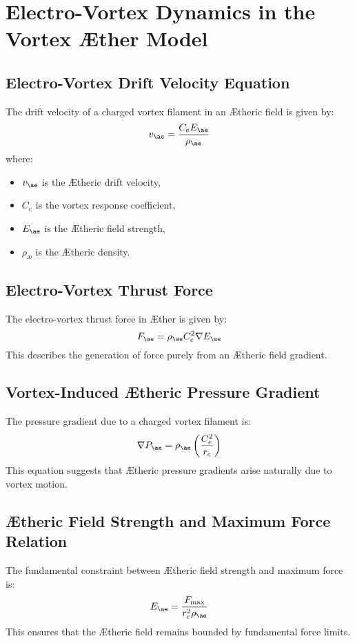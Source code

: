 \section{Electro-Vortex Dynamics in the Vortex Æther Model}

\subsection{Electro-Vortex Drift Velocity Equation}
The drift velocity of a charged vortex filament in an Ætheric field is given by:
\begin{equation}
    v_{\ae} = \frac{C_e E_{\ae}}{\rho_{\text{\ae}}}
\end{equation}
where:
\begin{itemize}
    \item $v_{\ae}$ is the Ætheric drift velocity,
    \item $C_e$ is the vortex response coefficient,
    \item $E_{\ae}$ is the Ætheric field strength,
    \item $\rho_{\text{\ae}}$ is the Ætheric density.
\end{itemize}

\subsection{Electro-Vortex Thrust Force}
The electro-vortex thrust force in Æther is given by:
\begin{equation}
    F_{\ae} = \rho_{\text{\ae}} C_e^2 \nabla E_{\ae}
\end{equation}
This describes the generation of force purely from an Ætheric field gradient.

\subsection{Vortex-Induced Ætheric Pressure Gradient}
The pressure gradient due to a charged vortex filament is:
\begin{equation}
    \nabla P_{\ae} = \rho_{\text{\ae}} \left( \frac{C_e^2}{r_c} \right)
\end{equation}
This equation suggests that Ætheric pressure gradients arise naturally due to vortex motion.

\subsection{\AE theric Field Strength and Maximum Force Relation}
The fundamental constraint between Ætheric field strength and maximum force is:
\begin{equation}
    E_{\ae} = \frac{F_{\max}}{r_c^2 \rho_{\text{\ae}}}
\end{equation}
This ensures that the Ætheric field remains bounded by fundamental force limits.

